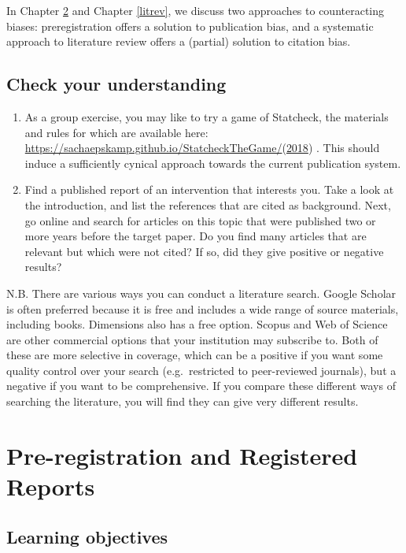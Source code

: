 \documentclass{krantz}
\begin{document}
In Chapter \ref{prereg} and Chapter \ref{litrev}, we discuss two approaches to counteracting biases: preregistration offers a solution to publication bias, and a systematic approach to literature review offers a (partial) solution to citation bias.

\hypertarget{check-your-understanding-20}{%
\section{Check your understanding}\label{check-your-understanding-20}}

\begin{enumerate}
\def\labelenumi{\arabic{enumi}.}
\item
  As a group exercise, you may like to try a game of Statcheck, the materials and rules for which are available here: \url{https://sachaepskamp.github.io/StatcheckTheGame/}(\protect\hyperlink{ref-epskamp}{2018}) . This should induce a sufficiently cynical approach towards the current publication system.
\item
  Find a published report of an intervention that interests you. Take a look at the introduction, and list the references that are cited as background. Next, go online and search for articles on this topic that were published two or more years before the target paper. Do you find many articles that are relevant but which were not cited? If so, did they give positive or negative results?
\end{enumerate}

N.B. There are various ways you can conduct a literature search. Google Scholar is often preferred because it is free and includes a wide range of source materials, including books. Dimensions also has a free option. Scopus and Web of Science are other commercial options that your institution may subscribe to. Both of these are more selective in coverage, which can be a positive if you want some quality control over your search (e.g.~restricted to peer-reviewed journals), but a negative if you want to be comprehensive. If you compare these different ways of searching the literature, you will find they can give very different results.

\hypertarget{prereg}{%
\chapter{Pre-registration and Registered Reports}\label{prereg}}

\hypertarget{learning-objectives-20}{%
\section{Learning objectives}\label{learning-objectives-20}}
\end{document}
